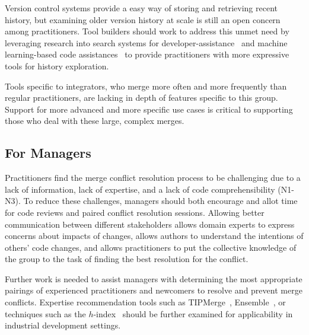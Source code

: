 Version control systems provide a easy way of storing and retrieving recent history, but examining older version history at scale is still an open concern among practitioners.
Tool builders should work to address this unmet need by leveraging research into search systems for developer-assistance~\cite{nabi2016putting} and machine learning-based code assistances~\cite{bradley2011history_exploration} to provide practitioners with more expressive tools for history exploration.

Tools specific to integrators, who merge more often and more frequently than regular practitioners, are lacking in depth of features specific to this group.
Support for more advanced and more specific use cases is critical to supporting those who deal with these large, complex merges. 

\subsection{For Managers}
Practitioners find the merge conflict resolution process to be challenging due to a lack of information, lack of expertise, and a lack of code comprehensibility (N1-N3). 
To reduce these challenges, managers should both encourage and allot time for code reviews and paired conflict resolution sessions. 
Allowing better communication between different stakeholders allows domain experts to express concerns about impacts of changes, allows authors to understand the intentions of others' code changes, and allows practitioners to put the collective knowledge of the group to the task of finding the best resolution for the conflict.

Further work is needed to assist managers with determining the most appropriate pairings of experienced practitioners and newcomers to resolve and prevent merge conflicts.
Expertise recommendation tools such as TIPMerge~\cite{CostaSarma}, Ensemble~\cite{xiang2008ensemble}, or techniques such as the $h$-index~\cite{bornmann2005does} should be further examined for applicability in industrial development settings.